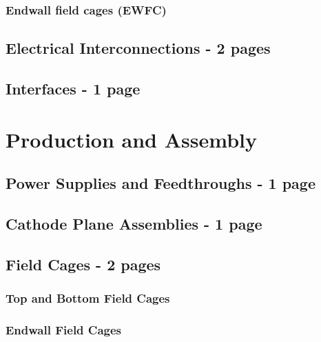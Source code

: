 \subsubsection{Endwall field cages (EWFC)}

\subsection{Electrical Interconnections - 2 pages} %
\label{sec:fdsp-hv-design-interconnect}

\subsection{Interfaces - 1 page}
\label{sec:fdsp-hv-transport-interfaces}


\clearpage
\section{Production and Assembly }
\label{sec:fdsp-hv-prod-assy}

\subsection{Power Supplies and Feedthroughs - 1 page}
\label{sec:fdsp-hv-supplies-feedthroughs}

\subsection{Cathode Plane Assemblies - 1 page}
\label{sec:fdsp-hv-prod-cpa}

\subsection{Field Cages - 2 pages}
\label{sec:fdsp-hv-prod-fc}

\subsubsection{Top and Bottom Field Cages}
\subsubsection{Endwall Field Cages}
